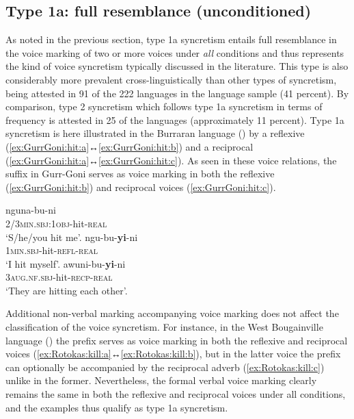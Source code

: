 \subsection{Type 1a: full resemblance (unconditioned)} \label{resemblance-type1a}
As noted in the previous section, type 1a syncretism entails full resemblance in the voice marking of two or more voices under \textit{all} conditions and thus represents the kind of voice syncretism typically discussed in the literature. This type is also considerably more prevalent cross-linguistically than other types of syncretism, being attested in 91 of the 222 languages in the language sample (41 percent). By comparison, type 2 syncretism which follows type 1a syncretism in terms of frequency is attested in 25 of the languages (approximately 11 percent). Type 1a syncretism is here illustrated in the Burraran language  () by a reflexive  (\ref{ex:GurrGoni:hit:a}↔\ref{ex:GurrGoni:hit:b}) and a reciprocal  (\ref{ex:GurrGoni:hit:a}↔\ref{ex:GurrGoni:hit:c}). As seen in these voice relations, the suffix  in Gurr-Goni serves as voice marking in both the reflexive (\ref{ex:GurrGoni:hit:b}) and reciprocal voices (\ref{ex:GurrGoni:hit:c}).

\newpage

\ea {} \citep[214]{green:1995}
\ea\label{ex:GurrGoni:hit:a}
	\gll	nguna-bu-ni \\
			\textsc{2/3min.sbj:1obj}-hit-\textsc{real} \\
	\glt	‘S/he/you hit me’.
\ex\label{ex:GurrGoni:hit:b}
	\gll	ngu-bu-\textbf{yi}-ni \\
			\textsc{1min.sbj}-hit-\textsc{refl-real} \\
	\glt	‘I hit myself’.
\ex\label{ex:GurrGoni:hit:c}
	\gll	awuni-bu-\textbf{yi}-ni \\
			\textsc{3aug.nf.sbj}-hit-\textsc{recp-real} \\
	\glt	‘They are hitting each other’.
	\z
\z

Additional non-verbal marking accompanying voice marking does not affect the classification of the voice syncretism. For instance, in the West Bougainville language  () the prefix  serves as voice marking in both the reflexive and reciprocal voices (\ref{ex:Rotokas:kill:a}↔\ref{ex:Rotokas:kill:b}), but in the latter voice the prefix can optionally be accompanied by the reciprocal adverb  (\ref{ex:Rotokas:kill:c}) unlike in the former. Nevertheless, the formal verbal voice marking clearly remains the same in both the reflexive and reciprocal voices under all conditions, and the  examples thus qualify as type 1a syncretism.

